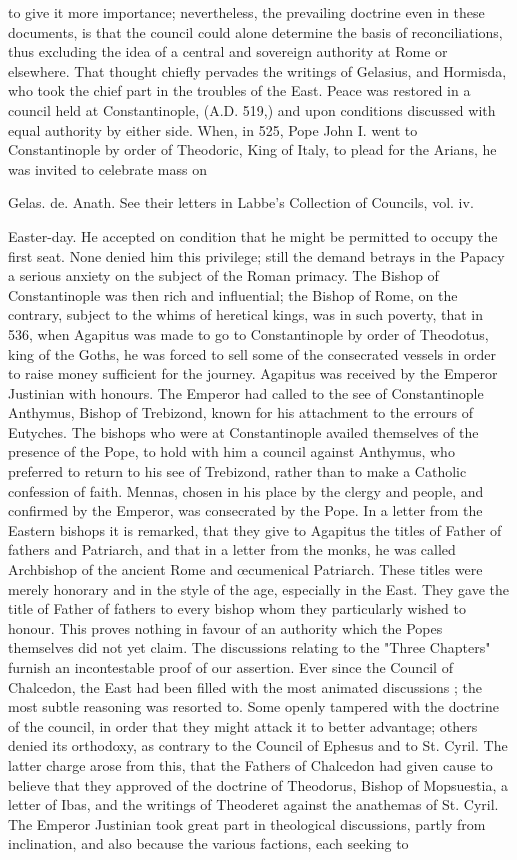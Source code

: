 to give it more importance; nevertheless, the prevailing doctrine even in these documents, is that the council could alone determine the basis of reconciliations, thus excluding the idea of a central and sovereign authority at Rome or elsewhere. That thought chiefly pervades the writings of Gelasius, and Hormisda, who took the chief part in the troubles of the East. Peace was restored in a council held at Constantinople, (A.D. 519,) and upon conditions discussed with equal authority by either side. When, in 525, Pope John I. went to Constantinople by order of Theodoric, King of Italy, to plead for the Arians, he was invited to celebrate mass on

Gelas. de. Anath. See their letters in Labbe’s Collection of Councils, vol. iv.

Easter-day. He accepted on condition that he might be permitted to occupy the first seat. None denied him this privilege; still the demand betrays in the Papacy a serious anxiety on the subject of the Roman primacy. The Bishop of Constantinople was then rich and influential; the Bishop of Rome, on the contrary, subject to the whims of heretical kings, was in such poverty, that in 536, when Agapitus was made to go to Constantinople by order of Theodotus, king of the Goths, he was forced to sell some of the consecrated vessels in order to raise money sufficient for the journey. Agapitus was received by the Emperor Justinian with honours. The Emperor had called to the see of Constantinople Anthymus, Bishop of Trebizond, known for his attachment to the errours of Eutyches. The bishops who were at Constantinople availed themselves of the presence of the Pope, to hold with him a council against Anthymus, who preferred to return to his see of Trebizond, rather than to make a Catholic confession of faith. Mennas, chosen in his place by the clergy and people, and confirmed by the Emperor, was consecrated by the Pope. In a letter from the Eastern bishops it is remarked, that they give to Agapitus the titles of Father of fathers and Patriarch, and that in a letter from the monks, he was called Archbishop of the ancient Rome and œcumenical Patriarch. These titles were merely honorary and in the style of the age, especially in the East. They gave the title of Father of fathers to every bishop whom they particularly wished to honour. This proves nothing in favour of an authority which the Popes themselves did not yet claim. The discussions relating to the "Three Chapters" furnish an incontestable proof of our assertion. Ever since the Council of Chalcedon, the East had been filled with the most animated discussions ; the most subtle reasoning was resorted to. Some openly tampered with the doctrine of the council, in order that they might attack it to better advantage; others denied its orthodoxy, as contrary to the Council of Ephesus and to St. Cyril. The latter charge arose from this, that the Fathers of Chalcedon had given cause to believe that they approved of the doctrine of Theodorus, Bishop of Mopsuestia, a letter of Ibas, and the writings of Theoderet against the anathemas of St. Cyril. The Emperor Justinian took great part in theological discussions, partly from inclination, and also because the various factions, each seeking to 
